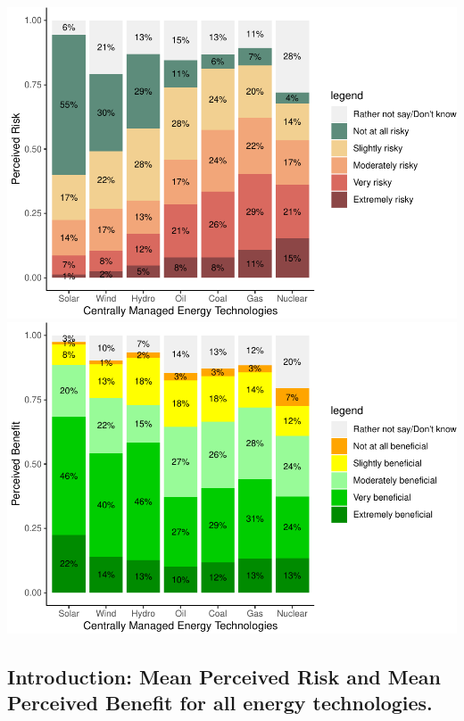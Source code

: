\documentclass[
]{article}
\begin{document}
\includegraphics{nuclear-in-comparison_files/figure-latex/unnamed-chunk-5-1.pdf}
\includegraphics{nuclear-in-comparison_files/figure-latex/unnamed-chunk-5-2.pdf}

\newpage

\hypertarget{introduction-mean-perceived-risk-and-mean-perceived-benefit-for-all-energy-technologies.}{%
\subsection{Introduction: Mean Perceived Risk and Mean Perceived Benefit
for all energy
technologies.}\label{introduction-mean-perceived-risk-and-mean-perceived-benefit-for-all-energy-technologies.}}
\end{document}
